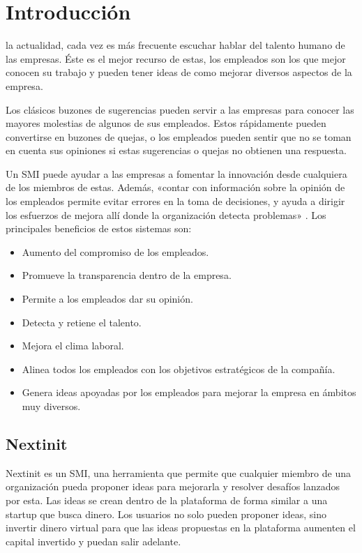 \chapter{Introducción}

 la actualidad, cada vez es más frecuente escuchar hablar del talento humano de las empresas. Éste es el mejor recurso de estas,
 los empleados son los que mejor conocen su trabajo y pueden tener ideas de como mejorar diversos aspectos de la empresa. 
 
 Los clásicos buzones de sugerencias pueden servir a las empresas para conocer las mayores molestias de algunos de sus empleados. Estos 
 rápidamente pueden convertirse en buzones de quejas, o los empleados pueden sentir que no se toman en cuenta sus opiniones si estas 
 sugerencias o quejas no obtienen una respuesta.
 
 Un \acf{SMI} puede ayudar a las empresas a fomentar la innovación desde cualquiera de los miembros de 
 estas. Además, «contar con información sobre la opinión de los empleados permite evitar errores en la toma de decisiones, y 
 ayuda a dirigir los esfuerzos de mejora allí donde la organización detecta problemas» \cite{talento}. Los principales beneficios de estos sistemas son:
 
 \begin{itemize}
 	\item Aumento del compromiso de los empleados.
 	\item Promueve la transparencia dentro de la empresa.
 	\item Permite a los empleados dar su opinión.
 	\item Detecta y retiene el talento.
 	\item Mejora el clima laboral.
 	\item Alinea todos los empleados con los objetivos estratégicos de la compañía.
 	\item Genera ideas apoyadas por los empleados para mejorar la empresa en ámbitos muy diversos.
 \end{itemize}
 
 
 \section{Nextinit}
 
 Nextinit es un \acs{SMI}, una herramienta que permite que cualquier miembro de una organización pueda proponer ideas para
 mejorarla y resolver desafíos lanzados por esta. Las ideas se crean dentro de la plataforma de forma similar a una startup que busca dinero. Los 
 usuarios no solo pueden  proponer ideas, sino invertir dinero virtual para que las ideas propuestas en la plataforma aumenten el capital invertido 
 y puedan salir adelante.
 
